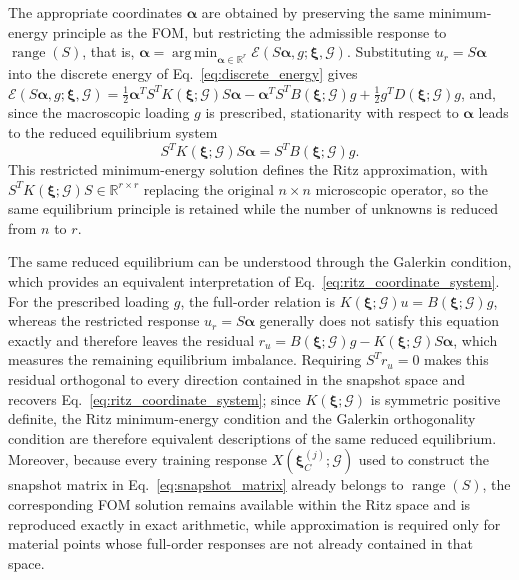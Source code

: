 \documentclass[pdflatex,sn-basic,Numbered]{sn-jnl}
\newcommand{\R}{\mathbb{R}}
\newcommand{\G}{\mathcal{G}}
\begin{document}
The appropriate coordinates \(\boldsymbol\alpha\) are obtained by preserving
the same minimum-energy principle as the FOM, but restricting the admissible
response to \(\operatorname{range}(S)\), that is,
\(\boldsymbol\alpha=
\operatorname*{arg\,min}_{\boldsymbol\alpha\in\R^r}
\mathcal E(S\boldsymbol\alpha,g;\boldsymbol\xi,\G)\). Substituting
\(u_r=S\boldsymbol\alpha\) into the discrete energy of
Eq.~\eqref{eq:discrete_energy} gives
\(\mathcal E(S\boldsymbol\alpha,g;\boldsymbol\xi,\G)
=\frac{1}{2}\boldsymbol\alpha^TS^TK(\boldsymbol\xi;\G)S\boldsymbol\alpha
-\boldsymbol\alpha^TS^TB(\boldsymbol\xi;\G)g
+\frac{1}{2}g^TD(\boldsymbol\xi;\G)g\), and, since the macroscopic loading
\(g\) is prescribed, stationarity with respect to
\(\boldsymbol\alpha\) leads to the reduced equilibrium system
\begin{equation}
\label{eq:ritz_coordinate_system}
S^T K(\boldsymbol\xi;\G)S\boldsymbol\alpha
=
S^T B(\boldsymbol\xi;\G)g.
\end{equation}
This restricted minimum-energy solution defines the Ritz approximation, with
\(S^TK(\boldsymbol\xi;\G)S\in\R^{r\times r}\) replacing the original
\(n\times n\) microscopic operator, so the same equilibrium principle is
retained while the number of unknowns is reduced from \(n\) to \(r\).

The same reduced equilibrium can be understood through the Galerkin
condition, which provides an equivalent interpretation of
Eq.~\eqref{eq:ritz_coordinate_system}. For the prescribed loading \(g\), the
full-order relation is
\(K(\boldsymbol\xi;\G)u=B(\boldsymbol\xi;\G)g\), whereas the restricted
response \(u_r=S\boldsymbol\alpha\) generally does not satisfy this equation
exactly and therefore leaves the residual
\(r_u=B(\boldsymbol\xi;\G)g-
K(\boldsymbol\xi;\G)S\boldsymbol\alpha\), which measures the remaining
equilibrium imbalance. Requiring \(S^Tr_u=0\) makes this residual orthogonal
to every direction contained in the snapshot space and recovers
Eq.~\eqref{eq:ritz_coordinate_system}; since
\(K(\boldsymbol\xi;\G)\) is symmetric positive definite, the Ritz
minimum-energy condition and the Galerkin orthogonality condition are
therefore equivalent descriptions of the same reduced equilibrium. Moreover,
because every training response
\(X(\boldsymbol\xi_C^{(j)};\G)\) used to construct the snapshot matrix in
Eq.~\eqref{eq:snapshot_matrix} already belongs to
\(\operatorname{range}(S)\), the corresponding FOM solution remains
available within the Ritz space and is reproduced exactly in exact
arithmetic, while approximation is required only for material points whose
full-order responses are not already contained in that space.
\end{document}
